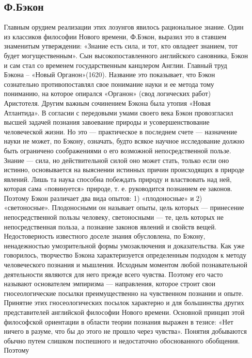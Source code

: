 \documentclass[12pt]{article}
\begin{document}
\subsection {Ф.Бэкон}
Главным
орудием реализации этих лозунгов явилось рациональное знание. Один из классиков философии Нового
времени,  Ф.Бэкон,  выразил  это  в  ставшем   знаменитым утверждении: «Знание есть сила, и  тот,  кто
овладеет знанием, тот будет могущественным».
Сын высокопоставленного английского сановника, Бэкон и сам стал со временем государственным канцлером
Англии. Главный  труд  Бэкона  – «Новый Органон»(1620).  Название это показывает, что  Бэкон сознательно
противопоставлял свое понимание науки и ее метода тому пониманию, на которое опирался «Органон» (свод
логических работ) Аристотеля. Другим важным сочинением Бэкона была утопия «Новая Атлантида».
В согласии с передовыми умами своего века Бэкон провозгласил высшей задачей познания завоевание природы
и усовершенствование человеческой жизни. Но это — практическое в последнем счете — назначение науки не
может, по Бэкону, означать, будто всякое научное исследование должно быть ограничено соображениями о его
возможной непосредственной пользе. Знание — сила, но действительной силой оно может стать, только если
оно истинно, основывается на выяснении истинных причин происходящих в природе явлений. Лишь та наука
способна побеждать природу и властвовать над ней, которая сама «повинуется» природе, т. е. руководится
познанием ее законов.
Поэтому Бэкон различает два вида опытов: 1) «плодоносные» и 2) «светоносные». Плодоносными он называет
опыты, цель которых — принесение непосредственной пользы человеку, светоносными — те, цель которых
не   непосредственная   польза,  а познание законов явлений и свойств вещей. Недостоверность известного
доселе знания обусловлена, по Бэкону, ненадежностью умозрительной формы умозаключения и доказательства.
Как  уже  говорилось,  творчество  Бэкона  характеризуется  определенным  подходом  к  методу  человеческого
познания и мышления. Исходным моментом любой познавательной деятельности являются для него прежде
всего  чувства.  Поэтому  его  часто  называют  основателем  эмпиризма  —  направления,  которое  строит  свои
гносеологические  посылки  преимущественно  на  чувственном  познании  и  опыте.  Принятие  этих
гносеологических  посылок  характерно  и  для  большинства  других  представителей  английской  философии
Нового времени. Основной принцип этой философской ориентации в области теории познания выражен в тезисе:
«Нет ничего в разуме, что бы до этого не прошло через чувства».
Понятия добываются обычно путем слишком поспешного и недостаточно обоснованного обобщения. Поэтому
\end{document}
